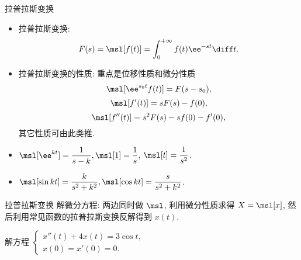 \documentclass[aspectratio=169,handout]{ctexbeamer}
\begin{document}
\begin{frame}{拉普拉斯变换}
	\begin{itemize}
		\item 拉普拉斯变换:
	\[
			F(s)=\msl[f(t)]=\displaystyle\int_0^{+\infty}f(t)\ee^{-st}\diff t.
	\]
		\item 拉普拉斯变换的性质: 重点是位移性质和微分性质
	\[
		\msl[\ee^{s_0t}f(t)]=F(s-s_0),
	\]
	\[
		\msl[f'(t)]=sF(s)-f(0),
	\]
	\[
		\msl[f''(t)]=s^2F(s)-sf(0)-f'(0),
	\]
		其它性质可由此类推.
		\item $\msl[\ee^{kt}]=\dfrac1{s-k},\msl[1]=\dfrac1s$,
		$\msl[t]=\dfrac1{s^2}$.
		\item $\msl[\sin{kt}]=\dfrac k{s^2+k^2},\msl[\cos{kt}]=\dfrac s{s^2+k^2}$.
	\end{itemize}
\end{frame}


\begin{frame}{拉普拉斯变换}
	\onslide<+->
	解微分方程: 两边同时做 $\msl$, 利用微分性质求得 $X=\msl[x]$, 然后利用常见函数的拉普拉斯变换反解得到 $x(t)$.
	\onslide<+->
	\begin{exercise}
		解方程 
		$\begin{cases}
			x''(t)+4x(t)=3\cos t,& \\
			x(0)=x'(0)=0.&
		\end{cases}$
	\end{exercise}
\end{frame}
\end{document}
